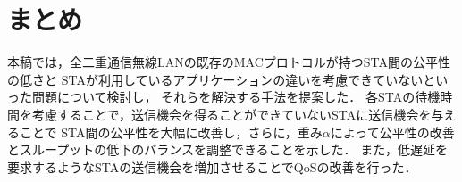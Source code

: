 \documentclass[technicalreport]{ieicej}
\begin{document}
\section{まとめ}
本稿では，全二重通信無線LANの既存のMACプロトコルが持つSTA間の公平性の低さと
STAが利用しているアプリケーションの違いを考慮できていないといった問題について検討し，
それらを解決する手法を提案した．
各STAの待機時間を考慮することで，送信機会を得ることができていないSTAに送信機会を与えることで
STA間の公平性を大幅に改善し，さらに，重み$\alpha$によって公平性の改善とスループットの低下のバランスを調整できることを示した．
また，低遅延を要求するようなSTAの送信機会を増加させることでQoSの改善を行った．





\end{document}
